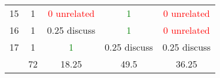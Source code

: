 \begin{center}
\begin{tabular}{ r | c || c c c }
  15                   & 1      & \textcolor{red}{0 unrelated} & \textcolor{green}{1}         & \textcolor{red}{0 unrelated} \\
  16                   & 1      & 0.25 discuss                 & \textcolor{green}{1}         & \textcolor{red}{0 unrelated} \\
  17                   & 1      & \textcolor{green}{1}         & 0.25 discuss                 & 0.25 discuss                 \\ \hline
                       & 72     & 18.25                        & 49.5                         & 36.25                        \\
 \end{tabular}
\end{center}
